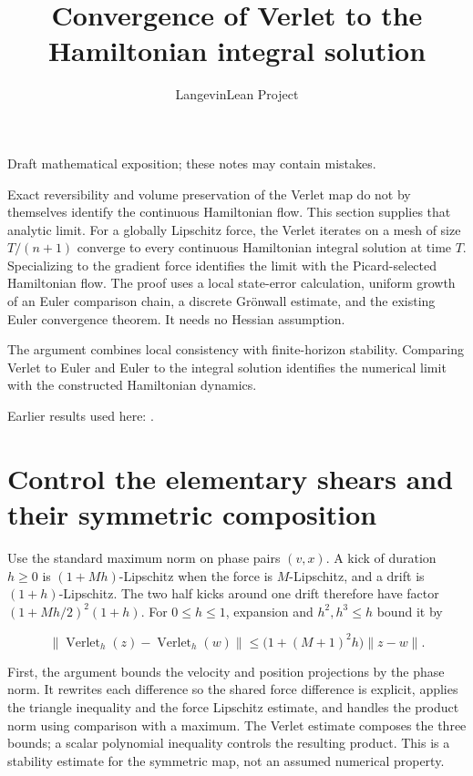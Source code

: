 \documentclass[11pt,a4paper]{article}
\title{\texorpdfstring{Convergence of Verlet to the Hamiltonian integral solution}{Convergence of Verlet to the Hamiltonian integral solution}}
\author{LangevinLean Project}
\date{}
\begin{document}
\maketitle
Draft mathematical exposition; these notes may contain mistakes.


Exact reversibility and volume preservation of the Verlet map do not by themselves identify the continuous Hamiltonian flow. This section supplies that analytic limit. For a globally Lipschitz force, the Verlet iterates on a mesh of size \(T/(n+1)\) converge to every continuous Hamiltonian integral solution at time \(T\). Specializing to the gradient force identifies the limit with the Picard-selected Hamiltonian flow. The proof uses a local state-error calculation, uniform growth of an Euler comparison chain, a discrete Grönwall estimate, and the existing Euler convergence theorem. It needs no Hessian assumption.



The argument combines local consistency with finite-horizon stability. Comparing Verlet to Euler and Euler to the integral solution identifies the numerical limit with the constructed Hamiltonian dynamics.



Earlier results used here: \cite[Section~3.16]{LangevinLean2026ULASC}.

\section{\texorpdfstring{Control the elementary shears and their symmetric composition}{Control the elementary shears and their symmetric composition}}


Use the standard maximum norm on phase pairs \((v,x)\). A kick of duration \(h\ge0\) is \((1+Mh)\)-Lipschitz when the force is \(M\)-Lipschitz, and a drift is \((1+h)\)-Lipschitz. The two half kicks around one drift therefore have factor \((1+Mh/2)^2(1+h)\). For \(0\le h\le1\), expansion and \(h^2,h^3\le h\) bound it by

\[\|\operatorname{Verlet}_h(z)-\operatorname{Verlet}_h(w)\|\le\bigl(1+(M+1)^2h\bigr)\|z-w\|.\]

First, the argument bounds the velocity and position projections by the phase norm. It rewrites each difference so the shared force difference is explicit, applies the triangle inequality and the force Lipschitz estimate, and handles the product norm using comparison with a maximum. The Verlet estimate composes the three bounds; a scalar polynomial inequality controls the resulting product. This is a stability estimate for the symmetric map, not an assumed numerical property.
\end{document}
